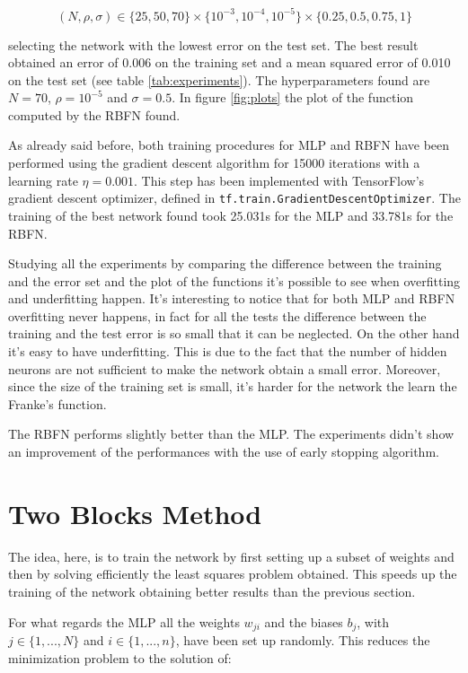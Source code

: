 \documentclass[a4paper]{article}
\numberwithin{equation}{section} %
\numberwithin{figure}{section} %
\numberwithin{table}{section} %
\theoremstyle{definition}
\begin{document}
\[ (N, \rho, \sigma) \in \Big\{25, 50, 70\Big\} \times \Big\{10^{-3}, 10^{-4}, 10^{-5}\Big\}
\times \Big\{0.25, 0.5, 0.75, 1\Big\} \]

\noindent selecting the network with the lowest error on the test set.
The best result obtained an error of 0.006 on the training set and a mean squared error of
0.010 on the test set (see table \ref{tab:experiments}).
The hyperparameters found are $N=70$, $\rho=10^{-5}$ and $\sigma=0.5$. In figure \ref{fig:plots}
the plot of the function computed by the RBFN found.

As already said before, both training procedures for MLP and RBFN have been
performed using the gradient descent algorithm for 15000 iterations with a
learning rate $\eta = 0.001$. This step has been implemented with TensorFlow's
gradient descent optimizer, defined in \texttt{tf.train.GradientDescentOptimizer}.
The training of the best network found took 25.031s for the MLP and 33.781s for
the RBFN.

Studying all the experiments by comparing the difference between the training
and the error set and the plot of the functions it's possible to see when
overfitting and underfitting happen. It's interesting to notice that for both
MLP and RBFN overfitting never happens, in fact for all the tests the difference
between the training and the test error is so small that it can be neglected.
On the other hand it's easy to have underfitting. This is due to the fact that
the number of hidden neurons are not sufficient to make the network obtain a
small error. Moreover, since the size of the training set is small, it's
harder for the network the learn the Franke's function.

The RBFN performs slightly better than the MLP. The experiments didn't show
an improvement of the performances with the use of early stopping algorithm.


\section{Two Blocks Method}

The idea, here, is to train the network by first setting up a subset of weights
and then by solving efficiently the least squares problem obtained. This
speeds up the training of the network obtaining better results than the
previous section.

For what regards the MLP all the weights $w_{ji}$ and the biases $b_j$, with
$j \in \{ 1, ..., N \} $ and $i \in \{ 1, ..., n \} $, have been set up
randomly. This reduces the minimization problem to the solution of:
\end{document}
